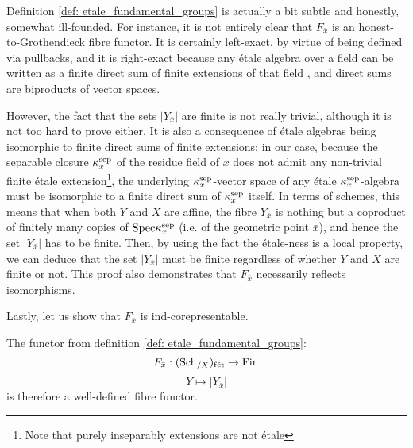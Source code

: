         \begin{remark}
            Definition \ref{def: etale_fundamental_groups} is actually a bit subtle and honestly, somewhat ill-founded. For instance, it is not entirely clear that $F_{\bar{x}}$ is an honest-to-Grothendieck fibre functor. It is certainly left-exact, by virtue of being defined via pullbacks, and it is right-exact because any \'etale algebra over a field can be written as a finite direct sum of finite extensions of that field \cite[\href{https://stacks.math.columbia.edu/tag/00U3}{Tag 00U3}]{stacks}, and direct sums are biproducts of vector spaces. 
            
            However, the fact that the sets $|Y_{\bar{x}}|$ are finite is not really trivial, although it is not too hard to prove either. It is also a consequence of \'etale algebras being isomorphic to finite direct sums of finite extensions: in our case, because the separable closure $\kappa_x^{\mathrm{sep}}$ of the residue field of $x$ does not admit any non-trivial finite \'etale extension\footnote{Note that purely inseparably extensions are not \'etale}, the underlying $\kappa_x^{\mathrm{sep}}$-vector space of any \'etale $\kappa_x^{\mathrm{sep}}$-algebra must be isomorphic to a finite direct sum of $\kappa_x^{\mathrm{sep}}$ itself. In terms of schemes, this means that when both $Y$ and $X$ are affine, the fibre $Y_{\bar{x}}$ is nothing but a coproduct of finitely many copies of $\mathrm{Spec} \kappa_x^{\mathrm{sep}}$ (i.e. of the geometric point $\bar{x}$), and hence the set $|Y_{\bar{x}}|$ has to be finite. Then, by using the fact the \'etale-ness is a local property, we can deduce that the set $|Y_{\bar{x}}|$ must be finite regardless of whether $Y$ and $X$ are finite or not. This proof also demonstrates that $F_{\bar{x}}$ necessarily reflects isomorphisms.
            
            Lastly, let us show that $F_{\bar{x}}$ is ind-corepresentable.
            
            The functor from definition \ref{def: etale_fundamental_groups}:
                $$F_{\bar{x}}: (\mathrm{Sch}_{/X})_{\mathrm{f\acute{e}t}} \to \mathrm{Fin}$$
                $$Y \mapsto |Y_{\bar{x}}|$$
            is therefore a well-defined fibre functor.
        \end{remark}
        
